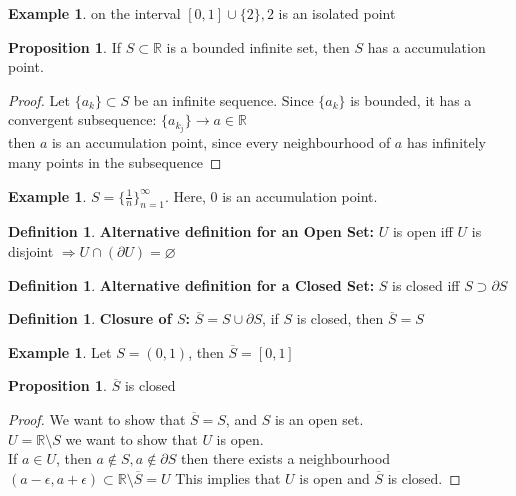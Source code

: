 \documentclass[12pt]{article}
\theoremstyle{plain}
\theoremstyle{definition}
\newtheorem{definition}[theorem]{Definition}
\newtheorem{example}[theorem]{Example}
\newtheorem{proposition}[theorem]{Proposition}
\begin{document}
\begin{example}
	on the interval $[0,1] \cup \{2 \}, 2$ is an isolated point
\end{example}

\begin{proposition}
	If $S \subset \mathbb{R}$ is a bounded infinite set, then $S$ has a accumulation point.
\end{proposition}

\begin{proof}
	Let $\{ a_k \} \subset S$ be an infinite sequence. Since $\{ a_k \} $ is bounded, it has a convergent subsequence: $\{ a_{k_j} \} \to a \in \mathbb{R}$
	\\
	then $a$ is an accumulation point, since every neighbourhood of $a$ has infinitely many points in the subsequence
\end{proof}

\begin{example}
	$S = \{ \frac{1}{n} \}^\infty_{n=1}$. Here, 0 is an accumulation point.
\end{example}

\begin{definition}
	\textbf{Alternative definition for an Open Set:} $U$ is open iff $U$ is disjoint $\Longrightarrow U \cap (\partial U )= \varnothing$
\end{definition}

\begin{definition}
	\textbf{Alternative definition for a Closed Set:} $S$ is closed iff $S \supset \partial S$
\end{definition}

\begin{definition}
	\textbf{Closure of $S$:} $\overline{S} = S \cup \partial S$, if $S$ is closed, then $\overline{S} = S$
\end{definition}

\begin{example}
	Let $S = (0,1)$, then $\overline{S} = [0,1]$
\end{example}

\begin{proposition}
	$\overline{S}$ is closed
\end{proposition}

\begin{proof}
	We want to show that $\overline{S} = S$, and $S$ is an open set.\\
	$U = \mathbb{R} \setminus S$ we want to show that $U$ is open.\\
	If $a\in U$, then $a \not\in S, a \not\in \partial S$ then there exists a neighbourhood $(a-\epsilon, a+\epsilon) \subset \mathbb{R} \setminus \overline{S} = U $
	 This implies that $U$ is open and $\overline{S}$ is closed.
\end{proof}
\end{document}
